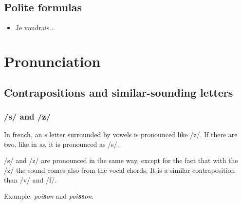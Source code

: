 \documentclass{epflnotes}
\begin{document}
\section{Polite formulas}

\begin{itemize}
\item Je voudrais...
\end{itemize}

\chapter{Pronunciation}

\section{Contrapositions and similar-sounding letters}

\subsection{/s/ and /z/}

In french, an \textit{s} letter surrounded by vowels is pronounced like /z/. If there are two, like in \textit{ss}, it is pronounced as /s/.

/s/ and /z/ are pronounced in the same way, except for the fact that with the /z/ the sound comes also from the vocal chords. It is a similar contraposition than /v/ and /f/.

Example: \textit{poi\textbf{s}on} and \textit{poi\textbf{ss}on}.

\backmatter
\printindex
\end{document}
